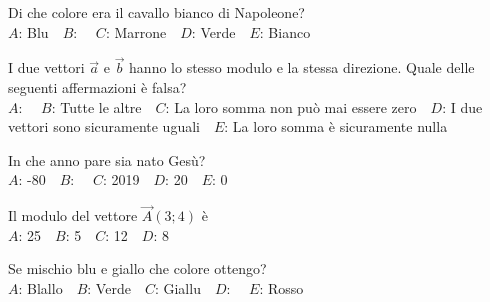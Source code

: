 \mcquestionfooter



\def\mcquestionnumber{8}


\mcquestionheader Di che colore era il cavallo bianco di Napoleone?\\
{$A$}: Blu\ \ {$B$}: \ \ {$C$}: Marrone\ \ {$D$}: Verde\ \ {$E$}: Bianco\ \ 

\mcquestionfooter



\def\mcquestionnumber{9}


\mcquestionheader I due vettori $\vec{a}$ e $\vec{b}$ hanno lo stesso modulo e la stessa direzione. Quale delle seguenti affermazioni è falsa?\\
{$A$}: \ \ {$B$}: Tutte le altre\ \ {$C$}: La loro somma non può mai essere zero\ \ {$D$}: I due vettori sono sicuramente uguali\ \ {$E$}: La loro somma è sicuramente nulla\ \ 

\mcquestionfooter



\def\mcquestionnumber{10}


\mcquestionheader In che anno pare sia nato Gesù?\\
{$A$}: -80\ \ {$B$}: \ \ {$C$}: 2019\ \ {$D$}: 20\ \ {$E$}: 0\ \ 

\mcquestionfooter



\def\mcquestionnumber{11}


\mcquestionheader Il modulo del vettore $\vec{A}(3;4)$ è\\
{$A$}: 25\ \ {$B$}: 5\ \ {$C$}: 12\ \ {$D$}: 8\ \ 

\mcquestionfooter



\def\mcquestionnumber{12}


\mcquestionheader Se mischio blu e giallo che colore ottengo?\\
{$A$}: Blallo\ \ {$B$}: Verde\ \ {$C$}: Giallu\ \ {$D$}: \ \ {$E$}: Rosso\ \ 

\mcquestionfooter



\mcpaperfooter

